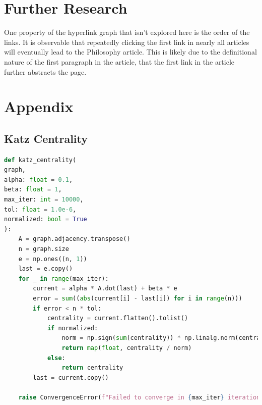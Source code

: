 \documentclass{article}
\begin{document}
\section{Further Research}

One property of the hyperlink graph that isn't explored here is the order of the links. It is observable that repeatedly clicking the first link in nearly all articles will eventually lead to the Philosophy article. This is likely due to the definitional nature of the first paragraph in the article, that the first link in the article further abstracts the page.




\section{Appendix}


\subsection*{Katz Centrality}
\linespread{1}
\begin{lstlisting}[language=Python]
def katz_centrality(
graph,
alpha: float = 0.1,
beta: float = 1,
max_iter: int = 10000,
tol: float = 1.0e-6,
normalized: bool = True
):
    A = graph.adjacency.transpose()
    n = graph.size
    e = np.ones((n, 1))
    last = e.copy()
    for _ in range(max_iter):
        current = alpha * A.dot(last) + beta * e
        error = sum((abs(current[i] - last[i]) for i in range(n)))
        if error < n * tol:
            centrality = current.flatten().tolist()
            if normalized:
                norm = np.sign(sum(centrality)) * np.linalg.norm(centrality)
                return map(float, centrality / norm)
            else:
                return centrality
        last = current.copy()

    raise ConvergenceError(f"Failed to converge in {max_iter} iterations.")
\end{lstlisting}
\end{document}
